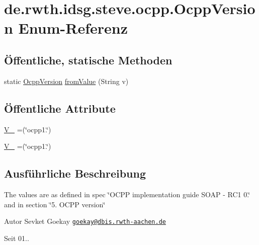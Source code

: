\hypertarget{enumde_1_1rwth_1_1idsg_1_1steve_1_1ocpp_1_1_ocpp_version}{\section{de.\-rwth.\-idsg.\-steve.\-ocpp.\-Ocpp\-Version Enum-\/\-Referenz}
\label{enumde_1_1rwth_1_1idsg_1_1steve_1_1ocpp_1_1_ocpp_version}
}
\subsection*{Öffentliche, statische Methoden}
\begin{DoxyCompactItemize}
\item 
static \hyperlink{enumde_1_1rwth_1_1idsg_1_1steve_1_1ocpp_1_1_ocpp_version}{Ocpp\-Version} \hyperlink{enumde_1_1rwth_1_1idsg_1_1steve_1_1ocpp_1_1_ocpp_version_aed69dc5ad96e8a2c013a2f84b99883de}{from\-Value} (String v)
\end{DoxyCompactItemize}
\subsection*{Öffentliche Attribute}
\begin{DoxyCompactItemize}
\item 
\hyperlink{enumde_1_1rwth_1_1idsg_1_1steve_1_1ocpp_1_1_ocpp_version_a02a262b834136db4a30bb9a821c77574}{V\-\_} =(\char`\"{}ocpp1.\char`\"{})
\item 
\hyperlink{enumde_1_1rwth_1_1idsg_1_1steve_1_1ocpp_1_1_ocpp_version_a73e998996dec6fa643fc3241249866d4}{V\-\_} =(\char`\"{}ocpp1.\char`\"{})
\end{DoxyCompactItemize}


\subsection{Ausführliche Beschreibung}
The values are as defined in spec \char`\"{}\-O\-C\-P\-P implementation guide S\-O\-A\-P -\/ R\-C1 0.\char`\"{} and in section \char`\"{}5. O\-C\-P\-P version\char`\"{}

\begin{DoxyAuthor}{Autor}
Sevket Goekay \href{mailto:goekay@dbis.rwth-aachen.de}{\tt goekay@dbis.\-rwth-\/aachen.\-de} 
\end{DoxyAuthor}
\begin{DoxySince}{Seit}
01.. 
\end{DoxySince}


